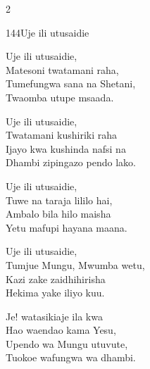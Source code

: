 \begin{multicols}{2}
\begin{hymn}{144}{Uje ili utusaidie}{}
\begin{stanza}
Uje ili utusaidie,\\
Matesoni twatamani raha,\\
Tumefungwa sana na Shetani,\\
Twaomba utupe msaada.
\end{stanza}
\begin{stanza}
Uje ili utusaidie,\\
Twatamani kushiriki raha\\
Ijayo kwa kushinda nafsi na\\
Dhambi zipingazo pendo lako.
\end{stanza}
\begin{stanza}
Uje ili utusaidie,\\
Tuwe na taraja lililo hai,\\
Ambalo bila hilo maisha\\
Yetu mafupi hayana maana.
\end{stanza}
\begin{stanza}
Uje ili utusaidie,\\
Tumjue Mungu, Mwumba wetu,\\
Kazi zake zaidhihirisha\\
Hekima yake iliyo kuu.
\end{stanza}
\begin{stanza}
Je! watasikiaje ila kwa\\
Hao waendao kama Yesu,\\
Upendo wa Mungu utuvute,\\
Tuokoe wafungwa wa dhambi.
\end{stanza}
\end{hymn}


\end{multicols}
